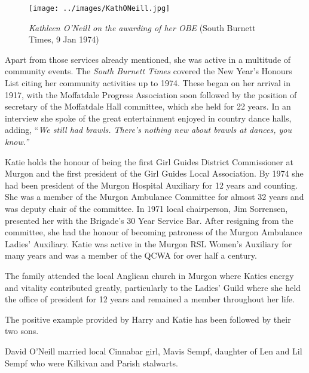\begin{figure}
\begin{center}
\texttt{[image: ../images/KathONeill.jpg]}
\caption{{\itshape Kathleen O'Neill on the awarding of her OBE} {\scriptsize(South Burnett Times, 9 Jan 1974)}}
\end{center}
\end{figure}




Apart from those services already mentioned, she was active in a multitude of community events. The \emph{South Burnett Times} covered the New Year's Honours List citing her community activities up to 1974. These began on her arrival in 1917, with the Moffatdale Progress Association soon followed by the position of secretary of the Moffatdale Hall committee, which she held for 22 years. In an interview she spoke of the great entertainment enjoyed in country dance halls, adding, ``\emph{We still had brawls. There's nothing new about brawls at dances, you know.''}



Katie holds the honour of being the first Girl Guides District Commissioner at Murgon and the first president of the Girl Guides Local Association. By 1974 she had been president of the Murgon Hospital Auxiliary for 12 years and counting. She was a member of the Murgon Ambulance Committee for almost 32 years and was deputy chair of the committee. In 1971 local chairperson, Jim Sorrensen, presented her with the Brigade's 30 Year Service Bar. After resigning from the committee, she had the honour of becoming patroness of the Murgon Ambulance Ladies' Auxiliary. Katie was active in the Murgon RSL Women's Auxiliary for many years and was a member of the QCWA for over half a century.



The family attended the local Anglican church in Murgon where Katies energy and vitality contributed greatly, particularly to the Ladies' Guild where she held the office of president for 12 years and remained a member throughout her life.



The positive example provided by Harry and Katie has been followed by their two sons.



David O'Neill married local Cinnabar girl, Mavis Sempf, daughter of Len and Lil Sempf who were Kilkivan and Parish stalwarts.




